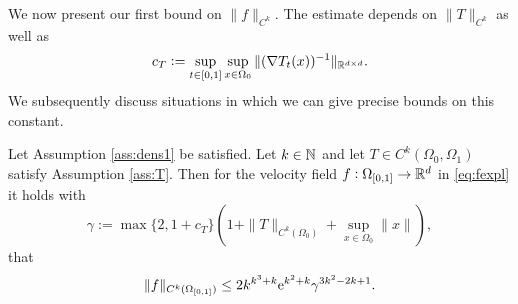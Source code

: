 


We now present our first bound on $\|f\|_{C^k}$. The estimate depends
on $\|T\|_{C^k}$ as well as
\begin{equation}\label{eq:cT}
  c_T:= \sup_{t\in[0,1]}\sup_{x\in \Omega_0}\|(\nabla T_t(x))^{-1}\|_{\mathbb{R}^{d\times d}}.
\end{equation}
We subsequently discuss situations in which we can give precise bounds
on this constant.





\begin{theorem}\label{thm:fNormGeneral}
  Let Assumption \ref{ass:dens1} be satisfied. Let $k\in\mathbb{N}$ and let
  $T\in C^k(\Omega_0,\Omega_1)$ satisfy Assumption \ref{ass:T}. Then
  for the velocity field $f:\Omega_{[0,1]}\to\mathbb{R}^d$ in \eqref{eq:fexpl} it
  holds with
\begin{equation*}
  \gamma :=\max\{2,1+c_T\}(1+\|T\|_{C^k(\Omega_0)}+\sup_{x\in\Omega_0}\|x\|),
\end{equation*}
that
\begin{equation*}
  \|f\|_{C^k(\Omega_{[0,1]})}\le 
 2k^{k^3 + k}\mathrm{e}^{k^2+k}\gamma^{3k^2-2k+1}.
\end{equation*}
\end{theorem}

